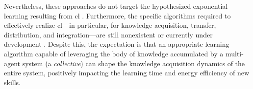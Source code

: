 \documentclass[12pt]{article}
\renewcommand{\emph}[1]{\textit{#1}}
\begin{document}
Nevertheless, these approaches do not target the hypothesized exponential learning resulting from \ac{cl} \cite{Haddadin2019Breakingwallcollective}. Furthermore, the specific algorithms required to effectively realize \ac{cl}---in particular, for knowledge acquisition, transfer, distribution, and integration---are still nonexistent or currently under development \cite{Haddadin2022collectivelearningtheory}. Despite this, the expectation is that an appropriate learning algorithm capable of leveraging the body of knowledge accumulated by a multi-agent system (a \emph{collective}) can shape the knowledge acquisition dynamics of the entire system, positively impacting the learning time and energy efficiency of new skills.

\end{document}
